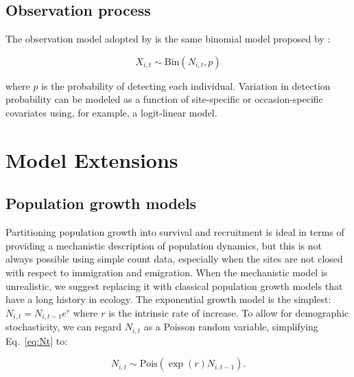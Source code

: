\documentclass[12pt,english]{article}
\begin{document}
\begin{spacing}{1.9}
\begin{flushleft}
\subsection*{Observation process}

The observation model adopted by \citet{dail_madsen:2011} is the same
binomial model proposed by \citet{royle:2004biom}: 
\begin{linenomath*}
\begin{equation}
  X_{i,t} \sim \mathrm{Bin}(N_{i,t}, p)
  \label{eq:p1}
\end{equation}
\end{linenomath*}
where $p$ is the probability of detecting each individual. Variation
in detection probability can be modeled as a function of site-specific
or occasion-specific covariates using, for example, a logit-linear model.

\section*{Model Extensions}
\label{sec:ext}
\subsection*{Population growth models}
\begin{samepage}
Partitioning population growth into survival and recruitment
is ideal in terms of providing a mechanistic description of population
dynamics, but this is not always possible using simple count data,
especially when the sites are not closed with respect to immigration
and emigration. 
When the mechanistic model is unrealistic, we suggest replacing it
with classical population growth models that have a long history in ecology.
The exponential growth model is the simplest: 
$N_{i,t} = N_{i,t-1}e^r$ where $r$ is the intrinsic
rate of increase. 
To allow for demographic stochasticity, we can regard $N_{i,t}$ as a Poisson 
random variable, simplifying Eq.~\ref{eq:Nt} to:
\begin{linenomath*}
\begin{equation}
  N_{i,t} \sim \mathrm{Pois}(\exp(r)N_{i,t-1}).
\label{eq:exp}
\end{equation}
\end{linenomath*}


\end{samepage}
\end{flushleft}
\end{spacing}
\end{document}
